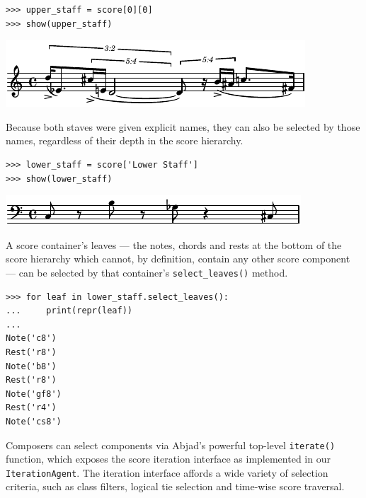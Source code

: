 \documentclass{article}
\begin{document}
\begin{lstlisting}
>>> upper_staff = score[0][0]
>>> show(upper_staff)
\end{lstlisting}
\includegraphics{assets/lilypond-9da0f4858f3377b553eae2208072c2bc.pdf}

Because both staves were given explicit names, they can also be selected by
those names, regardless of their depth in the score hierarchy.

\begin{lstlisting}
>>> lower_staff = score['Lower Staff']
>>> show(lower_staff)
\end{lstlisting}
\includegraphics{assets/lilypond-fa746e527d218a814e36af2f46d314bb.pdf}

A score container's leaves --- the notes, chords and rests at the bottom of the
score hierarchy which cannot, by definition, contain any other score component
--- can be selected by that container's \texttt{select\_leaves()} method.

\begin{lstlisting}
>>> for leaf in lower_staff.select_leaves():
...     print(repr(leaf))
...
Note('c8')
Rest('r8')
Note('b8')
Rest('r8')
Note('gf8')
Rest('r4')
Note('cs8')
\end{lstlisting}

Composers can select components via Abjad's powerful top-level
\texttt{iterate()} function, which exposes the score iteration interface as
implemented in our \texttt{IterationAgent}. The iteration interface affords a
wide variety of selection criteria, such as class filters, logical tie
selection and time-wise score traversal.
\end{document}
